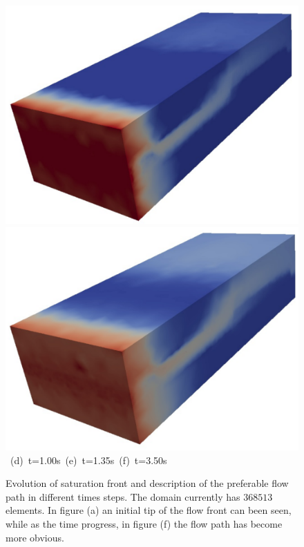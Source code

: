 \begin{landscape}
\begin{figure}[ht]
{{            \includegraphics[width=.5\textwidth]{./Pics1/3D_Channel/3D_channel_sat_150.pdf}
            \includegraphics[width=.5\textwidth]{./Pics1/3D_Channel/3D_channel_sat_490.pdf} }
      \hbox{\hspace{2.cm} (d) t=1.00s \hspace{5.cm} (e) t=1.35s\hspace{4.cm} (f) t=3.50s  } }
\caption{Evolution of saturation front and description of the preferable flow path in different times steps. The domain currently has $368513$ elements. In figure (a) an initial tip of the flow front can been seen, while as the time progress, in figure (f) the flow path has become more obvious.}
\label{fig:3DChannel_sat}
\end{figure}
\end{landscape}
\clearpage



